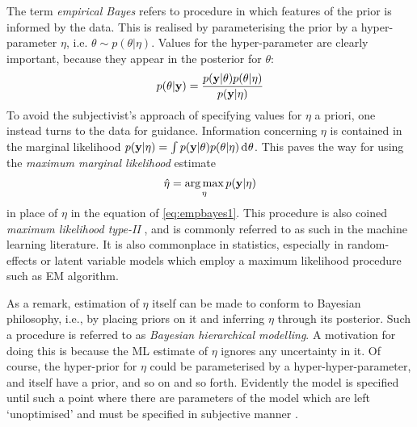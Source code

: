The term \emph{empirical Bayes} \citep{robbins1956empirical,casella1985introduction} refers to procedure in which features of the prior is informed by the data.
This is realised by parameterising the prior by a hyper-parameter $\eta$, i.e. $\theta \sim p(\theta|\eta)$.
Values for the hyper-parameter are clearly important, because they appear in the posterior for $\theta$: 
\begin{equation}\label{eq:empbayes1}
  p(\theta|{\mathbf y}) = \frac{p({\mathbf y}|\theta)p(\theta|\eta)}{p({\mathbf y}|\eta)} 
\end{equation}
To avoid the subjectivist's approach of specifying values for $\eta$ a priori, one instead turns to the data for guidance.
Information concerning $\eta$ is contained in the marginal likelihood $p({\mathbf y}|\eta) = \int p({\mathbf y}|\theta)p(\theta|\eta) \operatorname{d}\hspace{0.5pt}\! \theta$.
This paves the way for using the \emph{maximum marginal likelihood} estimate
\begin{equation}
  \hat\eta = \operatorname*{arg\,max}_\eta p({\mathbf y}|\eta) 
\end{equation}
in place of $\eta$ in the equation of \cref{eq:empbayes1}.
This procedure is also coined \emph{maximum likelihood type-II} \citep{bishop2006pattern}, and is commonly referred to as such in the machine learning literature. 
It is also commonplace in statistics, especially in random-effects or latent variable models which employ a maximum likelihood procedure such as EM algorithm.

As a remark, estimation of $\eta$ itself can be made to conform to Bayesian philosophy, i.e., by placing priors on it and inferring $\eta$ through its posterior.
Such a procedure is referred to as \emph{Bayesian hierarchical modelling}.
A motivation for doing this is because the ML estimate of $\eta$ ignores any uncertainty in it.
Of course, the hyper-prior for $\eta$ could be parameterised by a hyper-hyper-parameter, and itself have a prior, and so on and so forth.
Evidently the model is specified until such a point where there are parameters of the model which are left `unoptimised' and must be specified in subjective manner \citep{beal2003variational}.